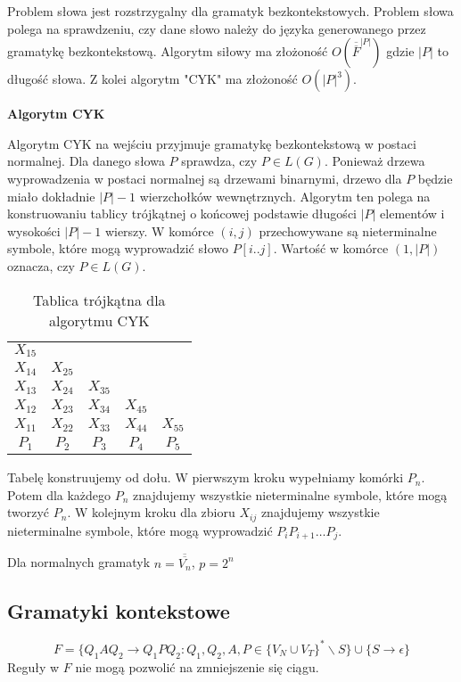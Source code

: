 \documentclass{../notatki}
\begin{document}
Problem słowa jest rozstrzygalny dla gramatyk bezkontekstowych.
Problem słowa polega na sprawdzeniu, czy dane słowo należy do języka
generowanego przez gramatykę bezkontekstową.
Algorytm siłowy ma złożoność $O(\overline{\overline{F}}^{|P|})$ gdzie $|P|$ to
długość słowa. Z kolei algorytm "CYK" ma złożoność $O(|P|^3)$.

\noindent \textbf{Algorytm CYK}

Algorytm CYK na wejściu przyjmuje gramatykę bezkontekstową w postaci
normalnej. Dla danego słowa $P$ sprawdza, czy $P \in L(G)$. Ponieważ drzewa
wyprowadzenia w postaci normalnej są drzewami binarnymi, drzewo dla $P$ będzie
miało dokładnie $|P| - 1$ wierzchołków wewnętrznych. Algorytm ten polega na
konstruowaniu tablicy trójkątnej o końcowej podstawie długości $|P|$ elementów
i wysokości $|P| - 1$ wierszy. W komórce $(i, j)$ przechowywane są nieterminalne
symbole, które mogą wyprowadzić słowo $P[i..j]$. Wartość w komórce $(1, |P|)$
oznacza, czy $P \in L(G)$.

\begin{table*}
  \centering
  \begin{tabular}{|ccccc}
    $X_{15}$ & & & & \\
    $X_{14}$ & $X_{25}$ & & & \\
    $X_{13}$ & $X_{24}$ & $X_{35}$ & & \\
    $X_{12}$ & $X_{23}$ & $X_{34}$ & $X_{45}$ & \\
    $X_{11}$ & $X_{22}$ & $X_{33}$ & $X_{44}$ & $X_{55}$ \\
    \hline
    $P_1$ & $P_2$ & $P_3$ & $P_4$ & $P_5$
  \end{tabular}
  \caption{Tablica trójkątna dla algorytmu CYK}
\end{table*}

Tabelę konstruujemy od dołu. W pierwszym kroku wypełniamy komórki $P_n$. Potem
dla każdego $P_n$ znajdujemy wszystkie nieterminalne symbole, które mogą
tworzyć $P_n$. W kolejnym kroku dla zbioru $X_{ij}$ znajdujemy wszystkie
nieterminalne symbole, które mogą wyprowadzić $P_iP_{i+1}\dots P_j$.

Dla normalnych gramatyk $n = \overline{\overline{V_n}}$, $p=2^n$

\subsection{Gramatyki kontekstowe}

$$
F = \{Q_1AQ_2 \rightarrow Q_1PQ_2 : Q_1, Q_2, A, P \in \{V_N \cup
V_T\}^* \backslash S\} \cup \{S \rightarrow \epsilon\}
$$
Reguły w $F$ nie mogą pozwolić na zmniejszenie się ciągu.
\end{document}
